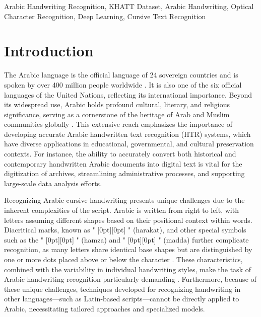 \documentclass[conference]{IEEEtran}
\newcommand{\artext}[1]{%
  {\fontsize{8pt}{11pt}\selectfont \raisebox{0pt}[0pt][0pt]{\RL{#1}}}%
}
\begin{document}

\begin{IEEEkeywords}
Arabic Handwriting Recognition, KHATT Dataset, Arabic Handwriting, Optical Character Recognition, Deep Learning, Cursive Text Recognition
\end{IEEEkeywords}

\section{Introduction}

The Arabic language is the official language of 24 sovereign countries and is spoken by over 400 million people worldwide \cite{saeed2024muharaf}. It is also one of the six official languages of the United Nations, reflecting its international importance. Beyond its widespread use, Arabic holds profound cultural, literary, and religious significance, serving as a cornerstone of the heritage of Arab and Muslim communities globally \cite{ayuba2013}. This extensive reach emphasizes the importance of developing accurate Arabic handwritten text recognition (HTR) systems, which have diverse applications in educational, governmental, and cultural preservation contexts. For instance, the ability to accurately convert both historical and contemporary handwritten Arabic documents into digital text is vital for the digitization of archives, streamlining administrative processes, and supporting large-scale data analysis efforts.

Recognizing Arabic cursive handwriting presents unique challenges due to the inherent complexities of the script. Arabic is written from right to left, with letters assuming different shapes based on their positional context within words. Diacritical marks, known as "\artext{حركات}" (harakat), and other special symbols such as the "\artext{همزة}" (hamza) and "\artext{مدّة}" (madda) further complicate recognition, as many letters share identical base shapes but are distinguished by one or more dots placed above or below the character \cite{el1990arabic}. These characteristics, combined with the variability in individual handwriting styles, make the task of Arabic handwriting recognition particularly demanding \cite{mutawa2024machine}. Furthermore, because of these unique challenges, techniques developed for recognizing handwriting in other languages—such as Latin-based scripts—cannot be directly applied to Arabic, necessitating tailored approaches and specialized models.
\end{document}
